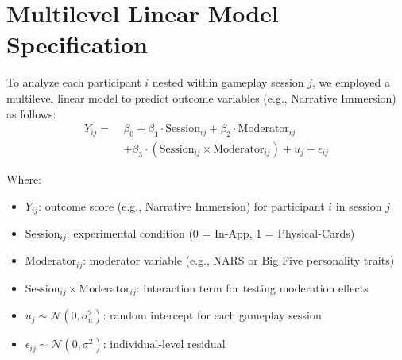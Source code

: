 \documentclass[sigconf,screen]{acmart-tagged}
\begin{document}
\section{Multilevel Linear Model Specification}
To analyze each participant $i$ nested within gameplay session $j$, we employed a multilevel linear model to predict outcome variables (e.g., Narrative Immersion) as follows:
\label{mlm}
\begin{align}
Y_{ij} = \ & \beta_0 + \beta_1 \cdot \text{Session}_{ij} + \beta_2 \cdot \text{Moderator}_{ij} \nonumber \\
          & + \beta_3 \cdot (\text{Session}_{ij} \times \text{Moderator}_{ij}) + u_j + \epsilon_{ij}
\end{align}

\noindent
Where:
\begin{itemize}
    \item $Y_{ij}$: outcome score (e.g., Narrative Immersion) for participant $i$ in session $j$
    \item $\text{Session}_{ij}$: experimental condition (0 = In-App, 1 = Physical-Cards)
    \item $\text{Moderator}_{ij}$: moderator variable (e.g., NARS or Big Five personality traits)
    \item $\text{Session}_{ij} \times \text{Moderator}_{ij}$: interaction term for testing moderation effects
    \item $u_j \sim \mathcal{N}(0, \sigma^2_u)$: random intercept for each gameplay session
    \item $\epsilon_{ij} \sim \mathcal{N}(0, \sigma^2)$: individual-level residual
\end{itemize}
\end{document}

